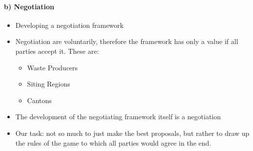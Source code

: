 \paragraph{b) Negotiation}

\begin{itemize}
    \item Developing a negotiation framework
    \item Negotiation are voluntarily, therefore the framework has only
        a value if all parties accept it. These are:
        \begin{itemize}
            \item Waste Producers
            \item Siting Regions
            \item Cantons
        \end{itemize}
    \item The development of the negotiating framework itself is a negotiation
    \item Our task: not so much to just make the best proposals, but rather
        to draw up the rules of the game to which all parties would agree in
        the end.
\end{itemize}

